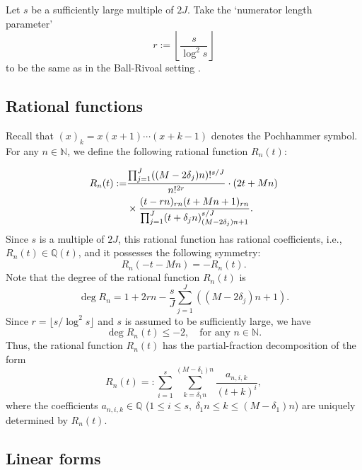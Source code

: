 \documentclass[12pt]{article}
\numberwithin{equation}{section}
\begin{document}
Let $s$ be a sufficiently large multiple of $2J$. Take the `numerator length parameter'
\begin{equation*}\label{defi_r}
	r := \left\lfloor \frac{s}{\log^2 s} \right\rfloor
\end{equation*}
to be the same as in the Ball-Rivoal setting \cite{BR2001}.


\subsection{Rational functions}

Recall that $(x)_k=x(x+1)\cdots(x+k-1)$ denotes the Pochhammer symbol. For any $n \in \mathbb{N}$, we define the following rational function $R_n(t)$:

\begin{align}
	 R_n(t) := &\frac{\prod_{j=1}^{J} ((M-2\delta_j)n)!^{s/J}}{n!^{2r}} \cdot (2t+Mn) \notag\\
	& \times \frac{(t-rn)_{rn} (t+Mn+1)_{rn}}{\prod_{j=1}^{J} (t+\delta_jn)_{(M-2\delta_j)n+1}^{s/J}}. \label{defi_R_n(t)}
\end{align} 
Since $s$ is a multiple of $2J$, this rational function has rational coefficients, i.e., $R_n(t) \in \mathbb{Q}(t)$, and it possesses the following symmetry:
\begin{equation}\label{symmetry}
	 R_n(-t-Mn) = - R_n(t). 
\end{equation}
Note that the degree of the rational function $R_n(t)$ is
\[ \deg R_n  = 1 + 2rn - \frac{s}{J}\sum_{j=1}^{J} \left((M-2\delta_j)n+1\right). \]
Since $r = \lfloor s/\log^2 s \rfloor$ and $s$ is assumed to be sufficiently large, we have 
\begin{equation}\label{degleq-2}
	 \deg R_n(t) \leqslant -2, \quad\text{for any~}n \in \mathbb{N}.
\end{equation}
Thus, the rational function $R_n(t)$ has the partial-fraction decomposition of the form
\begin{equation}\label{defi_anik}
	R_n(t) =: \sum_{i=1}^{s}\sum_{k=\delta_1 n}^{(M-\delta_1)n} \frac{a_{n,i,k}}{(t+k)^i},
\end{equation} 
where the coefficients $a_{n,i,k} \in \mathbb{Q}$ ($1 \leqslant i \leqslant s,~\delta_1n \leqslant k \leqslant (M-\delta_1)n$) are uniquely determined by $R_n(t)$. 

\subsection{Linear forms}
\end{document}
